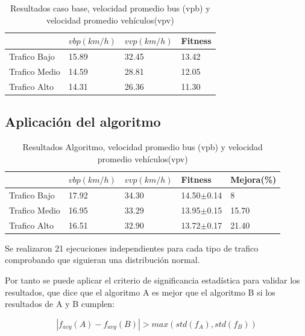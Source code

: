  \begin{table}[h]
 	\renewcommand{\arraystretch}{1.2}
 	\caption{Resultados caso base, velocidad promedio bus (vpb) y velocidad promedio vehículos(vpv) }
 	\label{table:resultado_caso_base}
 	\centering
 	\begin{tabular}{p{2.5cm}p{2.5cm}p{2.5cm}p{2cm} }
 		\hline
 		&
 		$vbp(km/h)$& 
 		$vvp(km/h)$ & 
 		Fitness \\ 
 		\hline
 		Trafico Bajo & 15.89  & 32.45& 13.42\\
 		Trafico Medio & 14.59  & 28.81& 12.05\\
 		Trafico Alto & 14.31  & 26.36& 11.30\\

 		\hline
 	\end{tabular}
 \end{table}


\subsection{Aplicación del algoritmo}


\begin{table}[h]
	\renewcommand{\arraystretch}{1.2}
	\caption{Resultados Algoritmo, velocidad promedio bus (vpb) y velocidad promedio vehículos(vpv) }
	\label{table:resultado_caso_algoritmo}
	\centering
	\begin{tabular}{p{2.5cm}p{2.5cm}p{2.5cm}p{2cm}p{2cm} }
		\hline
		&
		$vbp(km/h)$& 
		$vvp(km/h)$ & 
		Fitness &
		Mejora(\%)
		\\ 
		\hline
		Trafico Bajo & 17.92  & 34.30& 14.50$\pm$0.14 & 8\\
		Trafico Medio & 16.95  & 33.29& 13.95$\pm$0.15 & 15.70\\
		Trafico Alto & 16.51  & 32.90& 13.72$\pm$0.17 & 21.40\\
		
		\hline
	\end{tabular}
\end{table}

Se realizaron 21 ejecuciones independientes para cada tipo de trafico comprobando que siguieran una distribución normal.

Por tanto se puede aplicar el criterio de significancia estadística para validar los resultados, que dice que el
algoritmo A es mejor que el algoritmo B si los resultados de A y B cumplen:


\begin{equation}
\label{eq:funcion_significancia}
\left |f_{avg}(A) - f_{avg}(B)  \right | > max(std(f_A),std(f_B))
\end{equation}

